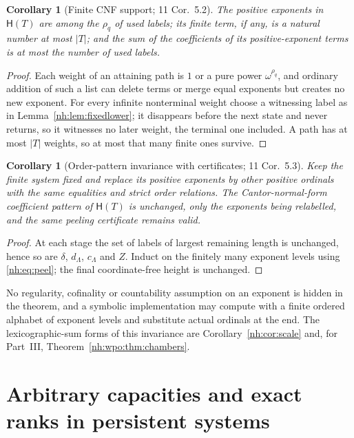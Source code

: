 \documentclass[11pt,a4paper]{article}
\newtheorem{corollary}[theorem]{Corollary}
\theoremstyle{definition}
\theoremstyle{remark}
\newcommand{\HH}{\mathsf H}
\begin{document}
\begin{corollary}[Finite CNF support; 11 Cor.~5.2]\label{nh:cor:support}
The positive exponents in $\HH(T)$ are among the $\rho_q$ of used labels; its
finite term, if any, is a natural number at most $|T|$; and the sum of the
coefficients of its positive-exponent terms is at most the number of used
labels.
\end{corollary}
\begin{proof}
Each weight of an attaining path is $1$ or a pure power $\omega^{\rho_q}$, and
ordinary addition of such a list can delete terms or merge equal exponents
but creates no new exponent. For every infinite nonterminal weight choose a
witnessing label as in Lemma~\ref{nh:lem:fixedlower}; it disappears before the
next state and never returns, so it witnesses no later weight, the terminal
one included. A path has at most $|T|$ weights, so at most that many finite
ones survive.
\end{proof}

\begin{corollary}[Order-pattern invariance with certificates; 11 Cor.~5.3]
\label{nh:cor:parametric}
Keep the finite system fixed and replace its positive exponents by other
positive ordinals with the same equalities and strict order relations. The
Cantor-normal-form coefficient pattern of $\HH(T)$ is unchanged, only the
exponents being relabelled, and the same peeling certificate remains valid.
\end{corollary}
\begin{proof}
At each stage the set of labels of largest remaining length is unchanged,
hence so are $\delta$, $d_\Lambda$, $c_\Lambda$ and $Z$. Induct on the
finitely many exponent levels using \eqref{nh:eq:peel}; the final
coordinate-free height is unchanged.
\end{proof}

No regularity, cofinality or countability assumption on an exponent is hidden
in the theorem, and a symbolic implementation may compute with a finite
ordered alphabet of exponent levels and substitute actual ordinals at the end.
The lexicographic-sum forms of this invariance are
Corollary~\ref{nh:cor:scale} and, for Part~III, Theorem~\ref{nh:wpo:thm:chambers}.

\section{Arbitrary capacities and exact ranks in persistent systems}
\label{nh:sec:local}
\end{document}
